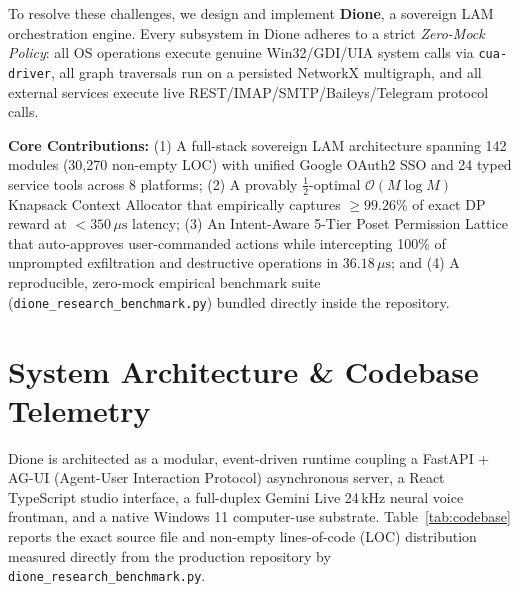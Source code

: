\documentclass[10pt,a4paper]{article}
\newcommand{\takeaway}[2]{%
  \vspace{5pt}\noindent\colorbox{primary!7}{%
    \parbox{\dimexpr\textwidth-2\fboxsep\relax}{%
      \vspace{3pt}\textbf{\color{primary}#1:}\hspace{0.4em}#2\vspace{3pt}%
    }%
  }\vspace{5pt}%
}
\begin{document}
To resolve these challenges, we design and implement \textbf{Dione}, a sovereign LAM orchestration engine. Every subsystem in Dione adheres to a strict \textit{Zero-Mock Policy}: all OS operations execute genuine Win32/GDI/UIA system calls via \texttt{cua-driver}, all graph traversals run on a persisted NetworkX multigraph, and all external services execute live REST/IMAP/SMTP/Baileys/Telegram protocol calls.

\takeaway{Core Contributions}{
(1) A full-stack sovereign LAM architecture spanning 142 modules (30,270 non-empty LOC) with unified Google OAuth2 SSO and 24 typed service tools across 8 platforms;
(2) A provably $\frac{1}{2}$-optimal $\mathcal{O}(M \log M)$ Knapsack Context Allocator that empirically captures $\ge 99.26\%$ of exact DP reward at $<350\,\mu\text{s}$ latency;
(3) An Intent-Aware 5-Tier Poset Permission Lattice that auto-approves user-commanded actions while intercepting 100\% of unprompted exfiltration and destructive operations in $36.18\,\mu\text{s}$; and
(4) A reproducible, zero-mock empirical benchmark suite (\texttt{dione\_research\_benchmark.py}) bundled directly inside the repository.
}

\section{System Architecture \& Codebase Telemetry}

Dione is architected as a modular, event-driven runtime coupling a FastAPI + AG-UI (Agent-User Interaction Protocol) asynchronous server, a React TypeScript studio interface, a full-duplex Gemini Live 24\,kHz neural voice frontman, and a native Windows 11 computer-use substrate. Table~\ref{tab:codebase} reports the exact source file and non-empty lines-of-code (LOC) distribution measured directly from the production repository by \texttt{dione\_research\_benchmark.py}.
\end{document}
